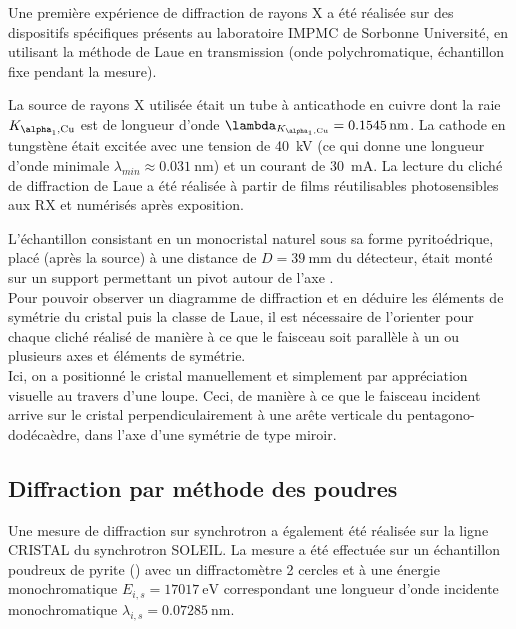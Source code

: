 Une première expérience de diffraction de rayons X a été réalisée sur des dispositifs spécifiques présents au laboratoire IMPMC de Sorbonne Université, en utilisant la méthode de Laue en transmission (onde polychromatique, échantillon fixe pendant la mesure).

La source de rayons X utilisée était un tube à anticathode en cuivre dont la raie \(K_{\alpha_1,\ce{Cu}}\) est de longueur d'onde \(\lambda_{K_{\alpha_1,\ce{Cu}}}=\SI{0.1545}{\nano\metre}\). La cathode en tungstène était excitée avec une tension de \SI{40}{\kilo\volt} (ce qui donne une longueur d'onde minimale \(\lambda_{min} \approx \SI{0.031}{\nano\metre}\)) et un courant de \SI{30}{\milli\ampere}. La lecture du cliché de diffraction de Laue a été réalisée à partir de films réutilisables photosensibles aux RX et numérisés après exposition.

L'échantillon consistant en un monocristal naturel sous sa forme pyritoédrique, placé (après la source) à une distance de \(D = \SI{39}{\milli\metre}\) du détecteur, était monté sur un support permettant un pivot autour de l'axe \hmn{[001]}.\\
Pour pouvoir observer un diagramme de diffraction et en déduire les éléments de symétrie du cristal puis la classe de Laue, il est nécessaire de l'orienter pour chaque cliché réalisé de manière à ce que le faisceau soit parallèle à un ou plusieurs axes et éléments de symétrie.\\
Ici, on a positionné le cristal manuellement et simplement par appréciation visuelle au travers d'une loupe.
Ceci, de manière à ce que le faisceau incident arrive sur le cristal perpendiculairement à une arête verticale du pentagono-dodécaèdre, dans l'axe d'une symétrie de type miroir.\\

\subsection{Diffraction par méthode des poudres}

Une mesure de diffraction sur synchrotron a également été réalisée sur la ligne CRISTAL du synchrotron SOLEIL. %
La mesure a été effectuée sur un échantillon poudreux de pyrite () avec un diffractomètre 2 cercles et à une énergie monochromatique \(E_{i,s} = \SI{17017}{\electronvolt}\) correspondant une longueur d'onde incidente monochromatique \(\lambda_{i,s} = \SI{0.07285}{\nano\metre}\).

